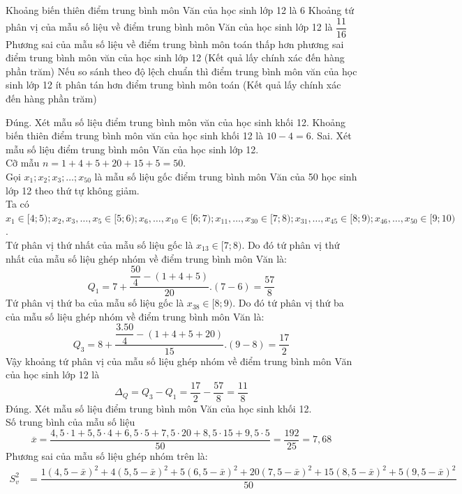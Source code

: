 \begin{ex}
\begin{center}
\begin{tikzpicture}[line join=round, line cap=round,>=stealth,xscale=1,yscale=1]
		\end{tikzpicture}
	\end{center}
	\choiceTF
	{\True Khoảng biến thiên điểm trung bình môn Văn của học sinh lớp 12 là $6$}
	{Khoảng tứ phân vị của mẫu số liệu về điểm trung bình môn Văn của học sinh lớp 12 là $\dfrac{11}{16}$}
	{\True Phương sai của mẫu số liệu về điểm trung bình môn toán thấp hơn phương sai điểm trung bình môn văn của học sinh lớp 12 (Kết quả lấy chính xác đến hàng phần trăm)}
	{Nếu so sánh theo độ lệch chuẩn thì điểm trung bình môn văn của học sinh lớp 12 ít phân tán hơn điểm trung bình môn toán (Kết quả lấy chính xác đến hàng phần trăm)}
	\loigiai
	{
		\begin{itemchoice}
			\itemch Đúng. Xét mẫu số liệu điểm trung bình môn văn của học sinh khối 12. Khoảng biến thiên điểm trung bình môn văn của học sinh khối 12 là $10-4=6$.
			\itemch Sai. Xét mẫu số liệu điểm trung bình môn Văn của học sinh lớp 12.\\
			Cỡ mẫu ${n}=1+4+5+20+15+5=50$.\\
			Gọi ${x}_{1} ; {x}_{2} ; {x}_{3} ; \ldots ; {x}_{50}$ là mẫu số liệu gốc điểm trung bình môn Văn của 50 học sinh lớp 12 theo thứ tự không giảm.\\
			Ta có
			${x}_{1} \in[4 ; 5) ; {x}_{2}, {x}_{3}, \ldots, {x}_{5} \in[5 ; 6) ; {x}_{6}, \ldots, {x}_{10} \in[6 ; 7) ; {x}_{11}, \ldots, {x}_{30} \in[7 ; 8) ; {x}_{31}, \ldots, {x}_{45} \in[8 ; 9) ; {x}_{46}, \ldots, {x}_{50} \in[9 ; 10)$.\\
			Tứ phân vị thứ nhất của mẫu số liệu gốc là $x_{13} \in[7 ; 8)$. Do đó tứ phân vị thứ nhất của mẫu số liệu ghép nhóm về điểm trung bình môn Văn là:
			$${Q}_{1}=7+\dfrac{\dfrac{50}{4}-(1+4+5)}{20} .(7-6)=\dfrac{57}{8}$$
			Tứ phân vị thứ ba của mẫu số liệu gốc là $x_{38} \in[8 ; 9)$. Do đó tứ phân vị thứ ba của mẫu số liệu ghép nhóm về điểm trung bình môn Văn là:
			$${Q}_{3}=8+\dfrac{\dfrac{3.50}{4}-(1+4+5+20)}{15} .(9-8)=\dfrac{17}{2}$$
			Vậy khoảng tứ phân vị của mẫu số liệu ghép nhóm về điểm trung bình môn Văn của học sinh lớp 12 là 
			$$ \Delta_{Q}={Q}_{3}-{Q}_{1}=\dfrac{17}{2}-\dfrac{57}{8}=\dfrac{11}{8}$$
			\itemch Đúng. Xét mẫu số liệu điểm trung bình môn Văn của học sinh khối 12. \\
			Số trung bình của mẫu số liệu
			$$\overline{{x}}=\dfrac{4,5 \cdot 1+5,5 \cdot 4+6,5 \cdot 5+7,5 \cdot 20+8,5 \cdot 15+9,5 \cdot 5}{50}=\dfrac{192}{25}=7,68$$
			Phương sai của mẫu số liệu ghép nhóm trên là:
			\begin{align*}
				S_{v}^{2}&=\dfrac{1(4,5-\bar{x})^{2}+4(5,5-\bar{x})^{2}+5(6,5-\bar{x})^{2}+20(7,5-\bar{x})^{2}+15(8,5-\bar{x})^{2}+5(9,5-\bar{x})^{2}}{50}\\

\end{align*}
\end{itemchoice}}
\end{ex}
